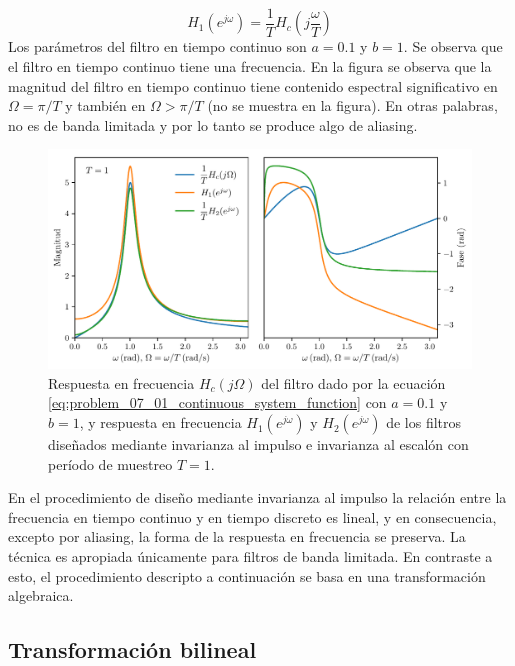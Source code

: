 \documentclass[a4paper]{report}
\begin{document}
\[
 H_1(e^{j\omega})=\frac{1}{T}H_c\left(j\frac{\omega}{T}\right)
\]
Los parámetros del filtro en tiempo continuo son \(a=0.1\) y \(b=1\). Se observa que el filtro en tiempo continuo tiene una frecuencia. En la figura se observa que la magnitud del filtro en tiempo continuo tiene contenido espectral significativo en \(\Omega=\pi/T\) y también en  \(\Omega>\pi/T\) (no se muestra en la figura). En otras palabras, no es de banda limitada y por lo tanto se produce algo de aliasing.
\begin{figure}[!htb]
 \begin{center}
 \includegraphics[width=1\textwidth]{figuras/filter_design_problem_07_01.pdf}
 \caption{\label{fig:filter_design_problem_07_01} Respuesta en frecuencia \(H_c(j\Omega)\) del filtro dado por la ecuación \ref{eq:problem_07_01_continuous_system_function} con \(a=0.1\) y \(b=1\), y respuesta en frecuencia \(H_1(e^{j\omega})\) y \(H_2(e^{j\omega})\) de los filtros diseñados mediante invarianza al impulso e invarianza al escalón con período de muestreo \(T=1\).}
 \end{center}
\end{figure}

En el procedimiento de diseño mediante invarianza al impulso la relación entre la frecuencia en tiempo continuo y en tiempo discreto es lineal, y en consecuencia, excepto por aliasing, la forma de la respuesta en frecuencia se preserva. La técnica es apropiada únicamente para filtros de banda limitada. En contraste a esto, el procedimiento descripto a continuación se basa en una transformación algebraica.
 
\subsection{Transformación bilineal}\label{sec:filter_design_bilinear_transform}
\end{document}
